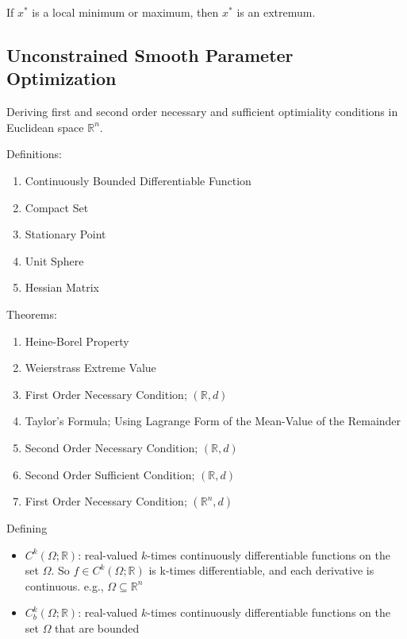 \begin{definition}[Extremum]
    
    If $x^*$ is a local minimum or maximum, then $x^*$ is an extremum.

\end{definition}

\subsection{Unconstrained Smooth Parameter Optimization}

\begin{summary}

Deriving first and second order necessary and sufficient optimiality conditions in Euclidean space $\mathbb{R}^n$.

Definitions:
\begin{enumerate}
    \item Continuously Bounded Differentiable Function
    \item Compact Set
    \item Stationary Point
    \item Unit Sphere
    \item Hessian Matrix
\end{enumerate}

Theorems:
\begin{enumerate}
    \item Heine-Borel Property
    \item Weierstrass Extreme Value
    \item First Order Necessary Condition; $(\mathbb{R},d)$
    \item Taylor's Formula; Using Lagrange Form of the Mean-Value of the Remainder
    \item Second Order Necessary Condition; $(\mathbb{R},d)$
    \item Second Order Sufficient Condition; $(\mathbb{R},d)$
    \item First Order Necessary Condition; $(\mathbb{R}^n,d)$
\end{enumerate}

\end{summary}

\begin{definition}

    Defining
    \begin{itemize}
        \item $C^k(\Omega;\mathbb{R})$: real-valued $k$-times continuously differentiable functions on the set $\Omega$. So $f\in C^k(\Omega;\mathbb{R})$ is k-times differentiable, and each derivative is continuous. e.g., $\Omega \subseteq \mathbb{R}^n$
        \item $C^k_b(\Omega;\mathbb{R})$: real-valued $k$-times continuously differentiable functions on the set $\Omega$ that are bounded
    \end{itemize}
    
\end{definition}

